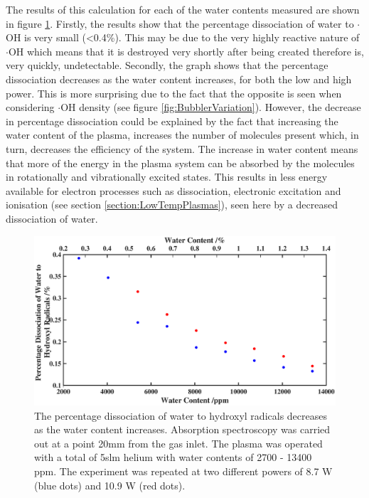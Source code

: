 \documentclass[11pt, oneside]{article}   	%
\begin{document}
The results of this calculation for each of the water contents measured are shown in figure \ref{fig:BubblerDissociation}.
Firstly, the results show that the percentage dissociation of water to $\cdot$OH is very small (\textless 0.4\%). This may be due to the very highly reactive nature of $\cdot$OH which means that it is destroyed very shortly after being created therefore is, very quickly, undetectable.
Secondly, the graph shows that the percentage dissociation decreases as the water content increases, for both the low and high power.
This is more surprising due to the fact that the opposite is seen when considering $\cdot$OH density (see figure \ref{fig:BubblerVariation}).
However, the decrease in percentage dissociation could be explained by the fact that increasing the water content of the plasma, increases the number of molecules present which, in turn, decreases the efficiency of the system.
The increase in water content means that more of the energy in the plasma system can be absorbed by the molecules in rotationally and vibrationally excited states.
This results in less energy available for electron processes such as dissociation, electronic excitation and ionisation (see section \ref{section:LowTempPlasmas}), seen here by a decreased dissociation of water.





\begin{figure}
    \centering
    \includegraphics[width=\textwidth]{Figures/BubblerDissociationBig.eps}
    \caption{The percentage dissociation of water to hydroxyl radicals decreases as the water content increases. Absorption spectroscopy was carried out at a point 20mm from the gas inlet. The plasma was operated with a total of 5slm helium with water contents of 2700 - 13400 ppm. The experiment was repeated at two different powers of 8.7 W (blue dots) and 10.9 W (red dots).}
    \label{fig:BubblerDissociation}
\end{figure}
\end{document}
